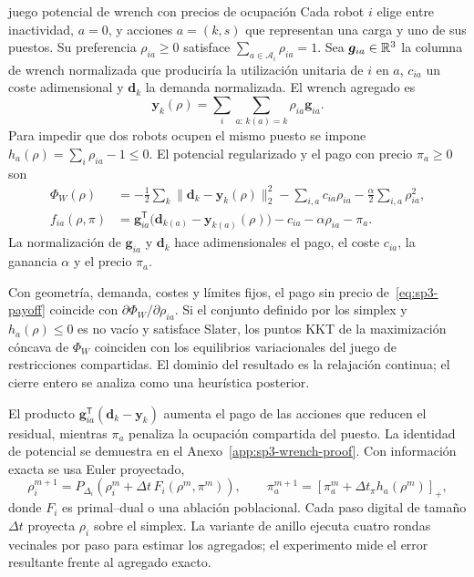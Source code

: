 \begin{contribucion}{juego potencial de wrench con precios de ocupación}
Cada robot $i$ elige entre inactividad, $a=0$, y acciones $a=(k,s)$ que representan una carga y uno de sus puestos. Su preferencia $\rho_{ia}\geq0$ satisface $\sum_{a\in\mathcal A_i}\rho_{ia}=1$. Sea $\boldsymbol g_{ia}\in\mathbb{R}^3$ la columna de wrench normalizada que produciría la utilización unitaria de $i$ en $a$, $c_{ia}$ un coste adimensional y $\boldsymbol d_k$ la demanda normalizada. El wrench agregado es
\begin{equation}
\label{eq:sp3-aggregate-wrench}
  \boldsymbol y_k(\rho)=
  \sum_i\sum_{a:\,k(a)=k}\rho_{ia}\boldsymbol g_{ia}.
\end{equation}
Para impedir que dos robots ocupen el mismo puesto se impone $h_a(\rho)=\sum_i\rho_{ia}-1\leq0$. El potencial regularizado y el pago con precio $\pi_a\geq0$ son
\begin{align}
\label{eq:sp3-potential}
  \Phi_W(\rho)
  &=-\frac12\sum_k\|\boldsymbol d_k-\boldsymbol y_k(\rho)\|_2^2
    -\sum_{i,a}c_{ia}\rho_{ia}
    -\frac{\alpha}{2}\sum_{i,a}\rho_{ia}^2,\\
\label{eq:sp3-payoff}
  f_{ia}(\rho,\pi)
  &=\boldsymbol g_{ia}^{\mathsf T}
    \bigl(\boldsymbol d_{k(a)}-\boldsymbol y_{k(a)}(\rho)\bigr)
    -c_{ia}-\alpha\rho_{ia}-\pi_a.
\end{align}
La normalización de $\boldsymbol g_{ia}$ y $\boldsymbol d_k$ hace adimensionales el pago, el coste $c_{ia}$, la ganancia $\alpha$ y el precio $\pi_a$.

\begin{proposicion}
\label{prop:sp3-wrench-potential}
Con geometría, demanda, costes y límites fijos, el pago sin precio de~\eqref{eq:sp3-payoff} coincide con $\partial\Phi_W/\partial\rho_{ia}$. Si el conjunto definido por los simplex y $h_a(\rho)\leq0$ es no vacío y satisface Slater, los puntos KKT de la maximización cóncava de $\Phi_W$ coinciden con los equilibrios variacionales del juego de restricciones compartidas. El dominio del resultado es la relajación continua; el cierre entero se analiza como una heurística posterior.
\end{proposicion}
\end{contribucion}

El producto $\boldsymbol g_{ia}^{\mathsf T}(\boldsymbol d_k-\boldsymbol y_k)$ aumenta el pago de las acciones que reducen el residual, mientras $\pi_a$ penaliza la ocupación compartida del puesto. La identidad de potencial se demuestra en el Anexo~\ref{app:sp3-wrench-proof}. Con información exacta se usa Euler proyectado,
\begin{equation}
\label{eq:sp3-digital-update}
  \rho_i^{m+1}=P_{\Delta_i}\!\left(\rho_i^m+\Delta t\,F_i(\rho^m,\pi^m)\right),
  \qquad
  \pi_a^{m+1}=\left[\pi_a^m+\Delta t_\pi h_a(\rho^m)\right]_+,
\end{equation}
donde $F_i$ es primal--dual o una ablación poblacional. Cada paso digital de tamaño $\Delta t$ proyecta $\rho_i$ sobre el simplex. La variante de anillo ejecuta cuatro rondas vecinales por paso para estimar los agregados; el experimento mide el error resultante frente al agregado exacto.

